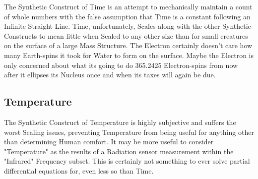 \documentclass[12pt]{article}
\begin{document}
The Synthetic Construct of Time is an attempt to mechanically maintain a count of whole numbers with the false assumption that Time is a constant following an Infinite Straight Line. Time, unfortunately, Scales along with the other Synthetic Constructs to mean little when Scaled to any other size than for small creatures on the surface of a large Mass Structure. The Electron certainly doesn't care how many Earth-spins it took for Water to form on the surface. Maybe the Electron is only concerned about what its going to do 365.2425 Electron-spins from now after it ellipses its Nucleus once and when its taxes will again be due.


\subsection{Temperature}

The Synthetic Construct of Temperature is highly subjective and suffers the worst Scaling issues, preventing Temperature from being useful for anything other than determining Human comfort. It may be more useful to consider "Temperature" as the results of a Radiation sensor measurement within the "Infrared" Frequency subset. This is certainly not something to ever solve partial differential equations for, even less so than Time.
\end{document}
